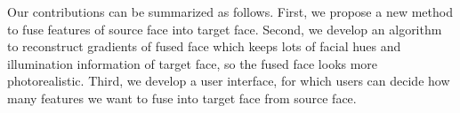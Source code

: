 Our contributions can be summarized as follows. First, we propose a new method to fuse features of source face into target face. Second, we develop an algorithm to reconstruct gradients of fused face which keeps lots of facial hues and illumination information of target face, so the fused face looks more photorealistic. Third, we develop a user interface, for which users can decide how many features we want to fuse into target face from source face. 